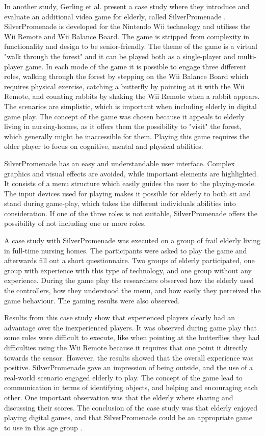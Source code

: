 In another study, Gerling et al. present a case study where they introduce and evaluate an additional video game for elderly, called SilverPromenade \cite{gerling2}.  SilverPromenade is developed for the Nintendo Wii technology and utilises the Wii Remote and Wii Balance Board. The game is stripped from complexity in functionality and design to be senior-friendly. The theme of the game is a virtual "walk through the forest" and it can be played both as a single-player and multi-player game. In each mode of the game it is possible to engage three different roles, walking through the forest by stepping on the Wii Balance Board which requires physical exercise, catching a butterfly by pointing at it with the Wii Remote, and counting rabbits by shaking the Wii Remote when a rabbit appears. The scenarios are simplistic, which is important when including elderly in digital game play. The concept of the game was chosen because it appeals to elderly living in nursing-homes, as it offers them the possibility to "visit" the forest, which generally might be inaccessible for them. Playing this game requires the older player to focus on cognitive, mental and physical abilities. 

SilverPromenade has an easy and understandable user interface. Complex graphics and visual effects are avoided, while important elements are highlighted. It consists of a menu structure which easily guides the user to the playing-mode. The input devices used for playing makes it possible for elderly to both sit and stand during game-play, which takes the different individuals abilities into consideration.  If one of the three roles is not suitable, SilverPromenade offers the possibility of not including one or more roles.

A case study with SilverPromenade was executed on a group of frail elderly living in full-time nursing homes. The participants were asked to play the game and afterwards fill out a short questionnaire. Two groups of elderly participated, one group with experience with this type of technology, and one group without any experience. During the game play the researchers observed how the elderly used the controllers, how they understood the menu, and how easily they perceived the game behaviour. The gaming results were also observed.

Results from this case study show that experienced players clearly had an advantage over the inexperienced players. It was observed during game play that some roles were difficult to execute, like when pointing at the butterflies they had difficulties using the Wii Remote because it requires that one point it directly towards the sensor. However, the results showed that the overall experience was positive. SilverPromenade gave an impression of being outside, and the use of a real-world scenario engaged elderly to play. The concept of the game lead to communication in terms of identifying objects, and helping and encouraging each other. One important observation was that the elderly where sharing and discussing their scores. The conclusion of the case study was that elderly enjoyed playing digital games, and that SilverPromenade could be an appropriate game to use in this age group \cite{gerling2}.

